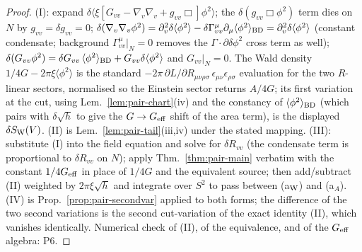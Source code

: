 \begin{proof}
(I): expand $\delta\langle\xi[G_{vv}-\nabla_{v}\nabla_{v}
+g_{vv}\Box]\phi^{2}\rangle$; the $\delta(g_{vv}\Box\phi^{2})$ term
dies on $N$ by $g_{vv}=\delta g_{vv}=0$; $\delta(\nabla_{v}\nabla_{v}
\phi^{2})=\partial_{v}^{2}\delta\langle\phi^{2}\rangle
-\delta\Gamma^{\mu}_{vv}\partial_{\mu}\langle\phi^{2}\rangle_{\rm BD}
=\partial_{v}^{2}\delta\langle\phi^{2}\rangle$ (constant condensate;
background $\Gamma^{\mu}_{vv}|_{N}=0$ removes the
$\Gamma\cdot\partial\delta\phi^{2}$ cross term as well);
$\delta(G_{vv}\phi^{2})=\delta G_{vv}\,\langle\phi^{2}\rangle_{\rm
BD}+G_{vv}\delta\langle\phi^{2}\rangle$ and $G_{vv}|_{N}=0$. The Wald
density $1/4G-2\pi\xi\langle\phi^{2}\rangle$ is the standard
$-2\pi\,\partial L/\partial R_{\mu\nu\rho\sigma}\,
\epsilon_{\mu\nu}\epsilon_{\rho\sigma}$ evaluation for the two
$R$-linear sectors, normalised so the Einstein sector returns
$A/4G$; its first variation at the cut, using
Lem.~\ref{lem:pair-chart}(iv) and the constancy of
$\langle\phi^{2}\rangle_{\rm BD}$ (which pairs with
$\delta\sqrt h$ to give the $G\to G_{\rm eff}$ shift of the area
term), is the displayed $\delta S_{\rm W}(V)$. (II) is
Lem.~\ref{lem:pair-tail}(iii,iv) under the stated mapping. (III):
substitute (I) into the field equation and solve for
$\delta R_{vv}$ (the condensate term is proportional to
$\delta R_{vv}$ on $N$); apply Thm.~\ref{thm:pair-main} verbatim with
the constant $1/4G_{\rm eff}$ in place of $1/4G$ and the equivalent
source; then add/subtract (II) weighted by $2\pi\xi\sqrt h$ and
integrate over $S^{2}$ to pass between (a$_{\rm W}$) and (a$_{A}$).
(IV) is Prop.~\ref{prop:pair-secondvar} applied to both forms; the
difference of the two second variations is the second cut-variation
of the exact identity (II), which vanishes identically. Numerical
check of (II), of the equivalence, and of the $G_{\rm eff}$ algebra:
P6.
\end{proof}

